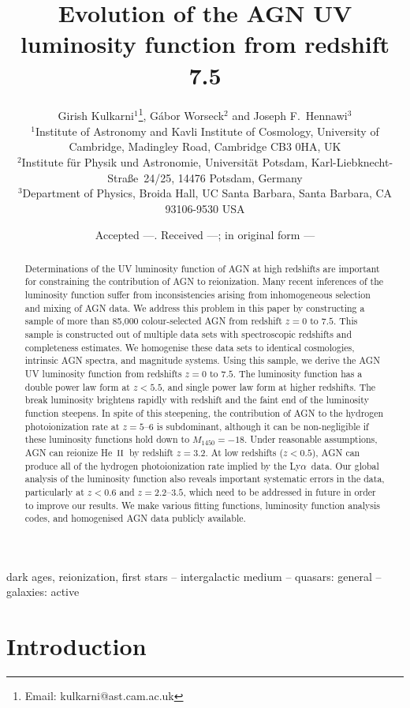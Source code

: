 \documentclass[fleqn,usenatbib]{mnras}
\title[AGN luminosity function]{Evolution of the AGN UV
  luminosity function from redshift 7.5}
\author[Kulkarni et al.]
       {{Girish Kulkarni$^{1}$\thanks{Email: kulkarni@ast.cam.ac.uk},
           G\'abor Worseck$^{2}$
           and Joseph F.~Hennawi$^{3}$} \\
         $^1$Institute of Astronomy and Kavli Institute of Cosmology,
         University of Cambridge, Madingley Road, Cambridge CB3 0HA,
         UK \\
         $^2$Institute f\"ur Physik und Astronomie, Universit\"at
         Potsdam, Karl-Liebknecht-Stra\ss e\ 24/25, 14476 Potsdam,
         Germany \\
         $^3$Department of Physics, Broida Hall, UC Santa Barbara,
         Santa Barbara, CA 93106-9530 USA}
\date{Accepted ---. Received ---; in original form ---}
\def\lya{Ly$\alpha$~}
\def\HeII{\hbox{He~$\scriptstyle\rm II$}}
\begin{document}
\label{firstpage}
\pagerange{\pageref{firstpage}--\pageref{lastpage}}
\maketitle

\begin{abstract}
  Determinations of the UV luminosity function of AGN at high
  redshifts are important for constraining the contribution of AGN to
  reionization.  Many recent inferences of the luminosity function
  suffer from inconsistencies arising from inhomogeneous selection and
  mixing of AGN data.  We address this problem in this paper by
  constructing a sample of more than 85,000 colour-selected AGN from
  redshift $z=0$ to $7.5$.  This sample is constructed out of multiple
  data sets with spectroscopic redshifts and completeness estimates.
  We homogenise these data sets to identical cosmologies, intrinsic
  AGN spectra, and magnitude systems.  Using this sample, we derive
  the AGN UV luminosity function from redshifts $z=0$ to $7.5$.  The
  luminosity function has a double power law form at $z<5.5$, and
  single power law form at higher redshifts.  The break luminosity
  brightens rapidly with redshift and the faint end of the luminosity
  function steepens.  In spite of this steepening, the contribution of
  AGN to the hydrogen photoionization rate at $z=5$--$6$ is
  subdominant, although it can be non-negligible if these luminosity
  functions hold down to $M_{1450}=-18$.  Under reasonable
  assumptions, AGN can reionize \HeII\ by redshift $z=3.2$.  At low
  redshifts ($z<0.5$), AGN can produce all of the hydrogen
  photoionization rate implied by the \lya data.  Our global analysis
  of the luminosity function also reveals important systematic errors
  in the data, particularly at $z<0.6$ and $z=2.2$--$3.5$, which need
  to be addressed in future in order to improve our results.  We make
  various fitting functions, luminosity function analysis codes, and
  homogenised AGN data publicly available.
\end{abstract}

\begin{keywords}
  dark ages, reionization, first stars -- intergalactic medium --
  quasars: general -- galaxies: active
\end{keywords}

\section{Introduction}
\end{document}
